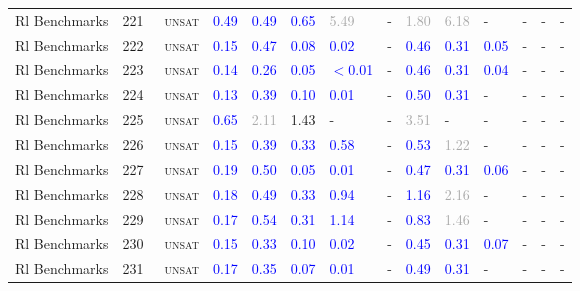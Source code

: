 \begin{center}
{\begin{longtable}{@{}llllllllllllll@{}}
Rl Benchmarks & 221 & ~\textsc{unsat} & \textcolor{blue}{0.49} & \textcolor{blue}{0.49} & \textcolor{blue}{0.65} & \textcolor{darkgray}{5.49} & - & \textcolor{darkgray}{1.80} & \textcolor{darkgray}{6.18} & - & - & - & - \\
Rl Benchmarks & 222 & ~\textsc{unsat} & \textcolor{blue}{0.15} & \textcolor{blue}{0.47} & \textcolor{blue}{0.08} & \textcolor{blue}{0.02} & - & \textcolor{blue}{0.46} & \textcolor{blue}{0.31} & \textcolor{blue}{0.05} & - & - & - \\
Rl Benchmarks & 223 & ~\textsc{unsat} & \textcolor{blue}{0.14} & \textcolor{blue}{0.26} & \textcolor{blue}{0.05} & \textcolor{blue}{$<$0.01} & - & \textcolor{blue}{0.46} & \textcolor{blue}{0.31} & \textcolor{blue}{0.04} & - & - & - \\
Rl Benchmarks & 224 & ~\textsc{unsat} & \textcolor{blue}{0.13} & \textcolor{blue}{0.39} & \textcolor{blue}{0.10} & \textcolor{blue}{0.01} & - & \textcolor{blue}{0.50} & \textcolor{blue}{0.31} & - & - & - & - \\
Rl Benchmarks & 225 & ~\textsc{unsat} & \textcolor{blue}{0.65} & \textcolor{darkgray}{2.11} & \textcolor{second}{1.43} & - & - & \textcolor{darkgray}{3.51} & - & - & - & - & - \\
Rl Benchmarks & 226 & ~\textsc{unsat} & \textcolor{blue}{0.15} & \textcolor{blue}{0.39} & \textcolor{blue}{0.33} & \textcolor{blue}{0.58} & - & \textcolor{blue}{0.53} & \textcolor{darkgray}{1.22} & - & - & - & - \\
Rl Benchmarks & 227 & ~\textsc{unsat} & \textcolor{blue}{0.19} & \textcolor{blue}{0.50} & \textcolor{blue}{0.05} & \textcolor{blue}{0.01} & - & \textcolor{blue}{0.47} & \textcolor{blue}{0.31} & \textcolor{blue}{0.06} & - & - & - \\
Rl Benchmarks & 228 & ~\textsc{unsat} & \textcolor{blue}{0.18} & \textcolor{blue}{0.49} & \textcolor{blue}{0.33} & \textcolor{blue}{0.94} & - & \textcolor{blue}{1.16} & \textcolor{darkgray}{2.16} & - & - & - & - \\
Rl Benchmarks & 229 & ~\textsc{unsat} & \textcolor{blue}{0.17} & \textcolor{blue}{0.54} & \textcolor{blue}{0.31} & \textcolor{blue}{1.14} & - & \textcolor{blue}{0.83} & \textcolor{darkgray}{1.46} & - & - & - & - \\
Rl Benchmarks & 230 & ~\textsc{unsat} & \textcolor{blue}{0.15} & \textcolor{blue}{0.33} & \textcolor{blue}{0.10} & \textcolor{blue}{0.02} & - & \textcolor{blue}{0.45} & \textcolor{blue}{0.31} & \textcolor{blue}{0.07} & - & - & - \\
Rl Benchmarks & 231 & ~\textsc{unsat} & \textcolor{blue}{0.17} & \textcolor{blue}{0.35} & \textcolor{blue}{0.07} & \textcolor{blue}{0.01} & - & \textcolor{blue}{0.49} & \textcolor{blue}{0.31} & - & - & - & - \\

\end{longtable}}
\end{center}
